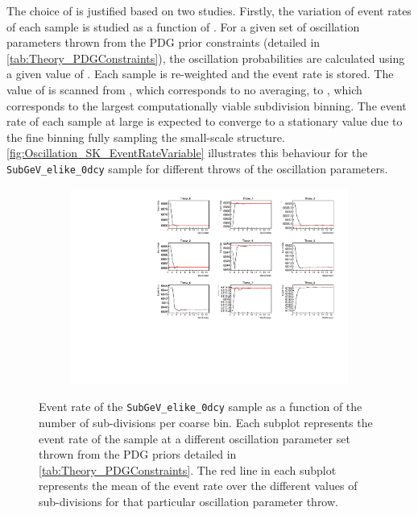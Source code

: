 The choice of  is justified based on two studies. Firstly, the variation of event rates of each sample is studied as a function of . For a given set of oscillation parameters thrown from the PDG prior constraints (detailed in \autoref{tab:Theory_PDGConstraints}), the oscillation probabilities are calculated using a given value of . Each sample is re-weighted and the event rate is stored. The value of  is scanned from , which corresponds to no averaging, to , which corresponds to the largest computationally viable subdivision binning. The event rate of each sample at large  is expected to converge to a stationary value due to the fine binning fully sampling the small-scale structure. \autoref{fig:Oscillation_SK_EventRateVariable} illustrates this behaviour for the \texttt{SubGeV\_elike\_0dcy} sample for  different throws of the oscillation parameters.

\begin{figure}[h]
  \begin{subfigure}[t]{\textwidth}
    \includegraphics[width=\textwidth, trim={0mm 0mm 0mm 0mm}, clip,page=1]{Figures/Oscillation/EventRate_VariableGraphs.pdf}
  \end{subfigure}
  \caption{Event rate of the \texttt{SubGeV\_elike\_0dcy} sample as a function of the number of sub-divisions per coarse bin. Each subplot represents the event rate of the sample at a different oscillation parameter set thrown from the PDG priors detailed in \autoref{tab:Theory_PDGConstraints}. The red line in each subplot represents the mean of the event rate over the different values of sub-divisions for that particular oscillation parameter throw.}
  \label{fig:Oscillation_SK_EventRateVariable}
\end{figure}

